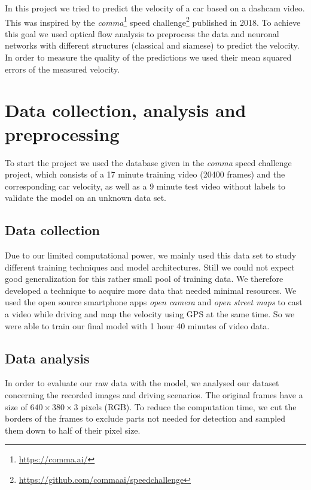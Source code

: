 \documentclass[conference]{IEEEtran}
\begin{document}
In this project we tried to predict the velocity of a car based on a dashcam video. This was inspired by  the \emph{comma}\footnote{\url{https://comma.ai/}} speed challenge\footnote{\url{https://github.com/commaai/speedchallenge}} published in 2018. To achieve this goal we used optical flow analysis to preprocess the data and neuronal networks with different structures (classical and siamese) to predict the velocity. In order to measure the quality of the predictions we used their mean squared errors of the measured velocity.

\section{Data collection, analysis and preprocessing}

To start the project we used the database given in the \emph{comma} speed challenge project, which consists of a 17 minute training video (20400 frames) and the corresponding car velocity, as well as a 9 minute test video without labels to validate the model on an unknown data set.

\subsection{Data collection}

Due to our limited computational power, we mainly used this data set to study different training techniques and model architectures. Still we could not expect good generalization for this rather small pool of training data. We therefore developed a technique to acquire more data that needed minimal resources. We used the open source smartphone apps \emph{open camera} and \emph{open street maps} to cast a video while driving and map the velocity using GPS at the same time. So we were able to train our final model with 1 hour 40 minutes of video data.

\subsection{Data analysis}
\label{subsec:dataAnalysis}

In order to evaluate our raw data with the model, we analysed our dataset concerning the recorded images and driving scenarios. The original frames have a size of $640\times380\times3$ pixels (RGB). To reduce the computation time, we cut the borders of the frames to exclude parts not needed for detection and sampled them down to half of their pixel size.
\end{document}

